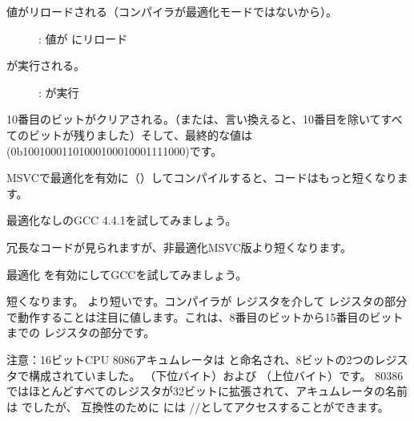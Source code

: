 \clearpage
値がリロードされる（コンパイラが最適化モードではないから）。

\begin{figure}[H]
\centering
{}
\caption{\olly: 値が \EDX にリロード}
\label{fig:set_reset_olly3}
\end{figure}

\clearpage
\AND が実行される。

\begin{figure}[H]
\centering
{}
\caption{\olly: \AND が実行}
\label{fig:set_reset_olly4}
\end{figure}

10番目のビットがクリアされる。（または、言い換えると、10番目を除いてすべてのビットが残りました）そして、最終的な値は
 (0b1001000110100010001{\color{red}0}001111000)です。


MSVCで最適化を有効に（\Ox）してコンパイルすると、コードはもっと短くなります。




最適化なしのGCC 4.4.1を試してみましょう。



冗長なコードが見られますが、非最適化MSVC版より短くなります。

最適化 \Othree を有効にしてGCCを試してみましょう。




短くなります。
より短いです。コンパイラが \AH レジスタを介して \EAX レジスタの部分で動作することは注目に値します。これは、8番目のビットから15番目のビットまでの \EAX レジスタの部分です。


注意：16ビットCPU 8086アキュムレータは \AX と命名され、8ビットの2つのレジスタで構成されていました。
\AL （下位バイト）および \AH （上位バイト）です。
80386ではほとんどすべてのレジスタが32ビットに拡張されて、アキュムレータの名前は \EAX でしたが、
互換性のために
には \AX/\AH/\AL としてアクセスすることができます。

